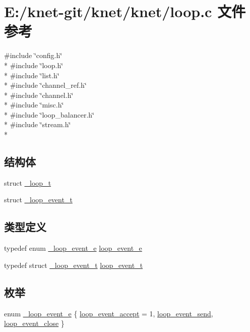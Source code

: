 \hypertarget{a00062}{}\section{E\+:/knet-\/git/knet/knet/loop.c 文件参考}
\label{a00062}
{\ttfamily \#include \char`\"{}config.\+h\char`\"{}}\\*
{\ttfamily \#include \char`\"{}loop.\+h\char`\"{}}\\*
{\ttfamily \#include \char`\"{}list.\+h\char`\"{}}\\*
{\ttfamily \#include \char`\"{}channel\+\_\+ref.\+h\char`\"{}}\\*
{\ttfamily \#include \char`\"{}channel.\+h\char`\"{}}\\*
{\ttfamily \#include \char`\"{}misc.\+h\char`\"{}}\\*
{\ttfamily \#include \char`\"{}loop\+\_\+balancer.\+h\char`\"{}}\\*
{\ttfamily \#include \char`\"{}stream.\+h\char`\"{}}\\*
\subsection*{结构体}
\begin{DoxyCompactItemize}
\item 
struct \hyperlink{a00029}{\+\_\+loop\+\_\+t}
\item 
struct \hyperlink{a00027}{\+\_\+loop\+\_\+event\+\_\+t}
\end{DoxyCompactItemize}
\subsection*{类型定义}
\begin{DoxyCompactItemize}
\item 
typedef enum \hyperlink{a00062_a19ff97cc6f736cb864d4e4b6ca60989d_a19ff97cc6f736cb864d4e4b6ca60989d}{\+\_\+loop\+\_\+event\+\_\+e} \hyperlink{a00062_ab92fe4e788615cfd56530167651a8ff4_ab92fe4e788615cfd56530167651a8ff4}{loop\+\_\+event\+\_\+e}
\item 
typedef struct \hyperlink{a00027}{\+\_\+loop\+\_\+event\+\_\+t} \hyperlink{a00062_a1095ee772017ce29dcac0987c456709e_a1095ee772017ce29dcac0987c456709e}{loop\+\_\+event\+\_\+t}
\end{DoxyCompactItemize}
\subsection*{枚举}
\begin{DoxyCompactItemize}
\item 
enum \hyperlink{a00062_a19ff97cc6f736cb864d4e4b6ca60989d_a19ff97cc6f736cb864d4e4b6ca60989d}{\+\_\+loop\+\_\+event\+\_\+e} \{ \hyperlink{a00062_a19ff97cc6f736cb864d4e4b6ca60989d_a19ff97cc6f736cb864d4e4b6ca60989da93a9ab540948567abea69a6e0b11dc34}{loop\+\_\+event\+\_\+accept} = 1, 
\hyperlink{a00062_a19ff97cc6f736cb864d4e4b6ca60989d_a19ff97cc6f736cb864d4e4b6ca60989da77ae92c7311b87c9e301782962e8d0bf}{loop\+\_\+event\+\_\+send}, 
\hyperlink{a00062_a19ff97cc6f736cb864d4e4b6ca60989d_a19ff97cc6f736cb864d4e4b6ca60989da93d334afa1678d196564d70b138c7150}{loop\+\_\+event\+\_\+close}
 \}
\end{DoxyCompactItemize}
